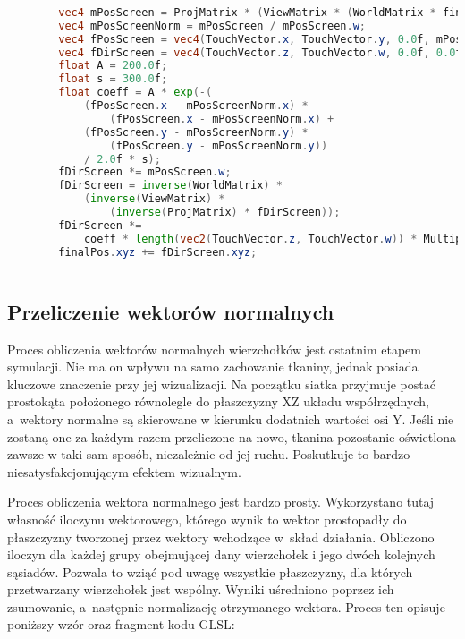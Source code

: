		\begin{lstlisting}[language=GLSL,caption={Obliczenie reakcji tkaniny na dotyk ekranu.},label={lst_5_4}]
		
		vec4 mPosScreen = ProjMatrix * (ViewMatrix * (WorldMatrix * finalPos));
		vec4 mPosScreenNorm = mPosScreen / mPosScreen.w;
		vec4 fPosScreen = vec4(TouchVector.x, TouchVector.y, 0.0f, mPosScreenNorm.w);
		vec4 fDirScreen = vec4(TouchVector.z, TouchVector.w, 0.0f, 0.0f);
		float A = 200.0f;
		float s = 300.0f;
		float coeff = A * exp(-(
			(fPosScreen.x - mPosScreenNorm.x) * 
				(fPosScreen.x - mPosScreenNorm.x) +
			(fPosScreen.y - mPosScreenNorm.y) * 
				(fPosScreen.y - mPosScreenNorm.y)) 
			/ 2.0f * s);
		fDirScreen *= mPosScreen.w;
		fDirScreen = inverse(WorldMatrix) * 
			(inverse(ViewMatrix) * 
				(inverse(ProjMatrix) * fDirScreen));
		fDirScreen *= 
			coeff * length(vec2(TouchVector.z, TouchVector.w)) * Multipliers.x;
		finalPos.xyz += fDirScreen.xyz;
		
		\end{lstlisting}
			
		\subsection{Przeliczenie wektorów normalnych}
		\label{t:symulacja:dzialanie:normalne}
			
		
		Proces obliczenia wektorów normalnych wierzchołków jest ostatnim etapem symulacji. Nie ma on wpływu na samo zachowanie tkaniny, jednak posiada kluczowe znaczenie przy jej wizualizacji. Na początku siatka przyjmuje postać prostokąta położonego równolegle do płaszczyzny XZ układu współrzędnych, a~wektory normalne są skierowane w kierunku dodatnich wartości osi Y. Jeśli nie zostaną one za każdym razem przeliczone na nowo, tkanina pozostanie oświetlona zawsze w taki sam sposób, niezależnie od jej ruchu. Poskutkuje to bardzo niesatysfakcjonującym efektem wizualnym.
		
		Proces obliczenia wektora normalnego jest bardzo prosty. Wykorzystano tutaj własność iloczynu wektorowego, którego wynik to wektor prostopadły do płaszczyzny tworzonej przez wektory wchodzące w~skład działania. Obliczono iloczyn dla każdej grupy obejmującej dany wierzchołek i jego dwóch kolejnych sąsiadów. Pozwala to wziąć pod uwagę wszystkie płaszczyzny, dla których przetwarzany wierzchołek jest wspólny. Wyniki uśredniono poprzez ich zsumowanie, a~następnie normalizację otrzymanego wektora. Proces ten opisuje poniższy wzór oraz fragment kodu GLSL:
		
